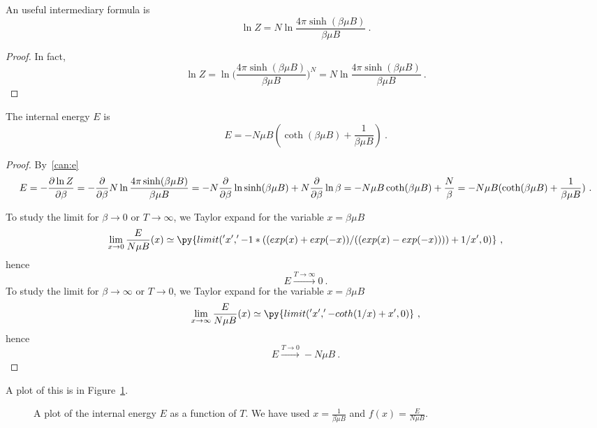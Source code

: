     An useful intermediary formula is 
    \begin{equation*}
        \ln Z = N \ln \frac{4 \pi \sinh (\beta \mu B)}{\beta \mu B}  ~.
    \end{equation*}
    \begin{proof}
        In fact,
        \begin{equation*}
            \ln Z = \ln \Big (\frac{4 \pi \sinh (\beta \mu B)}{\beta \mu B} \Big )^N = N \ln \frac{4 \pi \sinh (\beta \mu B)}{\beta \mu B}  ~.
        \end{equation*}
    \end{proof}
    
    The internal energy $E$ is 
    \begin{equation*}
        E = - N \mu B (\coth (\beta \mu B) + \frac{1}{\beta \mu B} ) ~.
    \end{equation*}
    \begin{proof}
        By~\eqref{can:e}
        \begin{equation*}
            E = - \frac{\partial\ln Z}{\partial\beta} = - \frac{\partial}{\partial\beta} N \ln \frac{4 \pi \sinh (\beta \mu B)}{\beta \mu B} = - N \frac{\partial}{\partial\beta} \ln \sinh (\beta \mu B) + N \frac{\partial}{\partial\beta} \ln \beta = - N \mu B \coth (\beta \mu B) + \frac{N}{\beta} = - N \mu B (\coth (\beta \mu B) + \frac{1}{\beta \mu B} ) ~.
        \end{equation*}

        To study the limit for $\beta \rightarrow 0$ or $T \rightarrow \infty$, we Taylor expand for the variable $x = \beta \mu B$
        \begin{equation*}
            \lim_{x \rightarrow 0} \frac{E}{N \mu B} (x) \simeq \py{limit('x', '- 1 * ((exp(x) + exp(-x))/((exp(x) - exp(-x)))) + 1 / x', 0)} ~,
        \end{equation*}
        hence 
        \begin{equation*}
            E \xrightarrow{T \rightarrow \infty} 0 ~.
        \end{equation*}
        To study the limit for $\beta \rightarrow \infty$ or $T \rightarrow 0$, we Taylor expand for the variable $x = \beta \mu B$
        \begin{equation*}
            \lim_{x \rightarrow \infty} \frac{E}{N \mu B} (x) \simeq \py{limit('x', '- coth(1 / x) + x', 0)} ~,
        \end{equation*}
        hence 
        \begin{equation*}
            E \xrightarrow{T \rightarrow 0} - N \mu B ~.
        \end{equation*}
    \end{proof}
    A plot of this is in Figure~\ref{can:magen}.
    \begin{figure}[h!]
        \centering
        \caption{A plot of the internal energy $E$ as a function of $T$. We have used $x = \frac{1}{\beta \mu B}$ and $f(x) = \frac{E}{N \mu B}$.}
        \label{can:magen}
    \end{figure}
    

